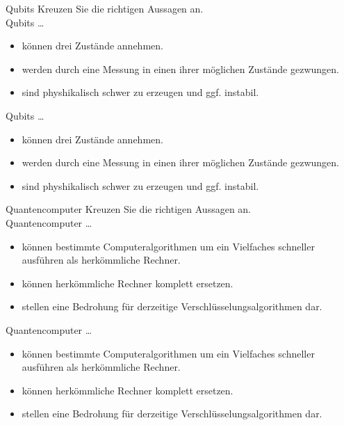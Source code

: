 \begin{aufgabe}[Quantencomputer]{Qubits}
    Kreuzen Sie die richtigen Aussagen an.\\
    Qubits \ldots
    \begin{itemize}[label={\Square}]
        \item können drei Zustände annehmen.
        \item werden durch eine Messung in einen ihrer möglichen Zustände gezwungen.
        \item sind physhikalisch schwer zu erzeugen und ggf. instabil.
    \end{itemize}
    \tcblower
    Qubits \ldots
    \begin{itemize}[label={\Square}]
        \item können drei Zustände annehmen.
        \item [\XBox] werden durch eine Messung in einen ihrer möglichen Zustände gezwungen.
        \item [\XBox] sind physhikalisch schwer zu erzeugen und ggf. instabil.
    \end{itemize}
\end{aufgabe}

\begin{aufgabe}{Quantencomputer}
    Kreuzen Sie die richtigen Aussagen an.\\
    Quantencomputer \ldots
    \begin{itemize}[label={\Square}]
        \item können bestimmte Computeralgorithmen um ein Vielfaches schneller ausführen als herkömmliche Rechner.
        \item können herkömmliche Rechner komplett ersetzen.
        \item stellen eine Bedrohung für derzeitige Verschlüsselungsalgorithmen dar.
    \end{itemize}
    \tcblower
    Quantencomputer \ldots
    \begin{itemize}[label={\Square}]
        \item [\XBox] können bestimmte Computeralgorithmen um ein Vielfaches schneller ausführen als herkömmliche Rechner.
        \item können herkömmliche Rechner komplett ersetzen.
        \item [\XBox] stellen eine Bedrohung für derzeitige Verschlüsselungsalgorithmen dar.
    \end{itemize}
\end{aufgabe}